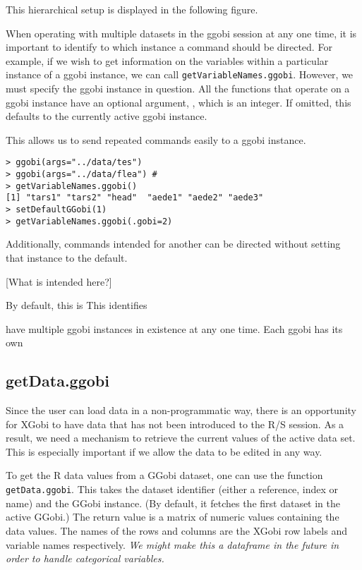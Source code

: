 \documentclass{article}
\def\SFunction#1{{\texttt{\red #1}}}
\def\note#1{\textsl{\red #1}}
\begin{document}
This hierarchical setup is displayed in the following
figure.
\begin{center}
\end{center}

When operating with multiple datasets in the ggobi session at any one
time, it is important to identify to which instance a command should
be directed.  For example, if we wish to get information on the
variables within a particular instance of a ggobi instance, we can
call \SFunction{getVariableNames.ggobi}. However, we must
specify the ggobi instance in question. All the functions
that operate on a ggobi instance have an optional argument,
, which is an integer.
If omitted, this defaults to the currently active
ggobi instance.

This allows us to send repeated commands easily to a ggobi instance.
\begin{verbatim}
> ggobi(args="../data/tes") 
> ggobi(args="../data/flea") #
> getVariableNames.ggobi()
[1] "tars1" "tars2" "head"  "aede1" "aede2" "aede3"
> setDefaultGGobi(1)
> getVariableNames.ggobi(.gobi=2)
\end{verbatim}
Additionally, commands intended for another can be directed without
setting that instance to the default.

[What is intended here?]

By default, this is 
This identifies 


have multiple ggobi
instances in existence at any one time.
Each ggobi has its own


\subsection{getData.ggobi}
Since the user can load data in a non-programmatic way, there is an
opportunity for XGobi to have data that has not been introduced to the
R/S session.  As a result, we need a mechanism to retrieve the current
values of the active data set.  This is especially important if we
allow the data to be edited in any way.

To get the R data values from a GGobi dataset, one can use the
function \SFunction{getData.ggobi}.  This takes the dataset identifier
(either a reference, index or name) and the GGobi instance.  (By
default, it fetches the first dataset in the active GGobi.)  The
return value is a matrix of numeric values containing the data values.
The names of the rows and columns are the XGobi row labels and
variable names respectively.  \note{We might make this a dataframe in
  the future in order to handle categorical variables.}
\end{document}
